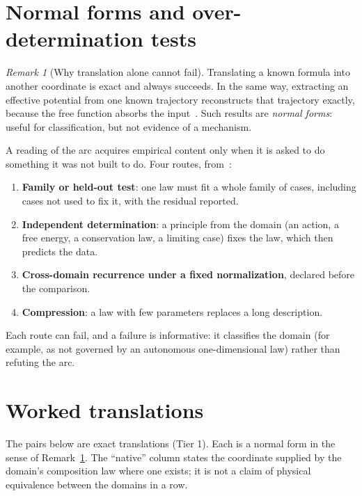 \documentclass[11pt]{article}
\theoremstyle{definition}
\theoremstyle{remark}
\newtheorem{remark}{Remark}
\begin{document}
\section{Normal forms and over-determination tests}\label{sec:tests}

\begin{remark}[Why translation alone cannot fail]\label{rem:tautology}
Translating a known formula into another coordinate is exact and always succeeds. In the
same way, extracting an effective potential from one known trajectory reconstructs that
trajectory exactly, because the free function absorbs the input~\cite{DeJesus2026EP}. Such
results are \emph{normal forms}: useful for classification, but not evidence of a mechanism.
\end{remark}

A reading of the arc acquires empirical content only when it is asked to do something it was
not built to do. Four routes, from~\cite{DeJesus2026EP}:
\begin{enumerate}\sloppy
\item \textbf{Family or held-out test}: one law must fit a whole family of cases, including
cases not used to fix it, with the residual reported.
\item \textbf{Independent determination}: a principle from the domain (an action, a free
energy, a conservation law, a limiting case) fixes the law, which then predicts the data.
\item \textbf{Cross-domain recurrence under a fixed normalization}, declared before the
comparison.
\item \textbf{Compression}: a law with few parameters replaces a long description.
\end{enumerate}
Each route can fail, and a failure is informative: it classifies the domain (for example,
as not governed by an autonomous one-dimensional law) rather than refuting the arc.

\section{Worked translations}\label{sec:pairs}

The pairs below are exact translations (Tier 1). Each is a normal form in the sense of
Remark~\ref{rem:tautology}. The ``native'' column states the coordinate supplied by the
domain's composition law where one exists; it is not a claim of physical equivalence between
the domains in a row.
\end{document}
